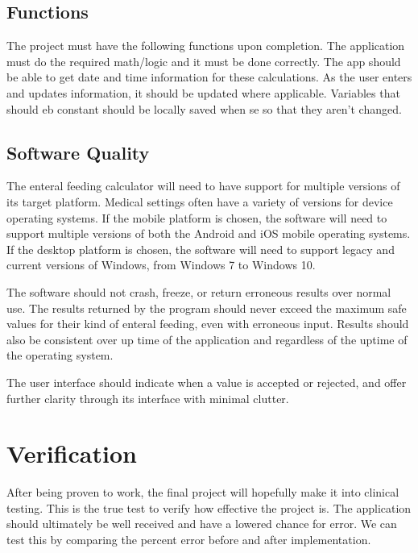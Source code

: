 \documentclass[fullpage,10pt, onecolumn, draftclsnofoot]{IEEEtran}
\begin{document}
\subsection{Functions}
The project must have the following functions upon completion. The application must do the required math/logic and it must be done correctly. The app should be able to get date and time information for these calculations. As the user enters and updates information, it should be updated where applicable. Variables that should eb constant should be locally saved when se so that they aren't changed.

\subsection{Software Quality}
The enteral feeding calculator will need to have support for multiple versions of its target platform. Medical settings often
have a variety of versions for device operating systems. If the mobile platform is chosen, the software will need to support 
multiple versions of both the Android and iOS mobile operating systems. If the desktop platform is chosen, the software will need
to support legacy and current versions of Windows, from Windows 7 to Windows 10.

The software should not crash, freeze, or return erroneous results over normal use. The results returned by the program should never
exceed the maximum safe values for their kind of enteral feeding, even with erroneous input. Results should also be consistent over
up time of the application and regardless of the uptime of the operating system.

The user interface should indicate when a value is accepted or rejected, and offer further clarity through its interface with minimal clutter.

\section{Verification}
After being proven to work, the final project will hopefully make it into clinical testing. This is the true test to verify how effective the project is. The application should ultimately be well received and have a lowered chance for error. We can test this by comparing the percent error before and after implementation.
\end{document}
